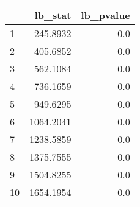 \begin{tabular}{lrr}
\toprule
{} &    lb\_stat &  lb\_pvalue \\
\midrule
1  &   245.8932 &        0.0 \\
2  &   405.6852 &        0.0 \\
3  &   562.1084 &        0.0 \\
4  &   736.1659 &        0.0 \\
5  &   949.6295 &        0.0 \\
6  &  1064.2041 &        0.0 \\
7  &  1238.5859 &        0.0 \\
8  &  1375.7555 &        0.0 \\
9  &  1504.8255 &        0.0 \\
10 &  1654.1954 &        0.0 \\
\bottomrule
\end{tabular}
